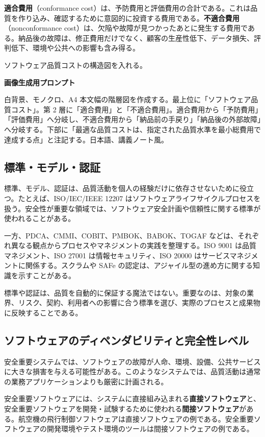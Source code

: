 \documentclass[11pt,a4paper]{article}
\newcommand{\term}[2]{\textbf{#1}（#2）}
\begin{document}
\term{適合費用}{conformance cost}は、予防費用と評価費用の合計である。これは品質を作り込み、確認するために意図的に投資する費用である。\term{不適合費用}{nonconformance cost}は、欠陥や故障が見つかったあとに発生する費用である。納品後の故障は、修正費用だけでなく、顧客の生産性低下、データ損失、評判低下、環境や公共への影響も含み得る。

\begin{todobox}
ソフトウェア品質コストの構造図を入れる。\par
\textbf{画像生成用プロンプト}\par
白背景、モノクロ、A4 本文幅の階層図を作成する。最上位に「ソフトウェア品質コスト」。第 2 層に「適合費用」と「不適合費用」。適合費用から「予防費用」「評価費用」へ分岐し、不適合費用から「納品前の手戻り」「納品後の外部故障」へ分岐する。下部に「最適な品質コストは、指定された品質水準を最小総費用で達成する点」と注記する。日本語、講義ノート風。
\end{todobox}

\subsection{標準・モデル・認証}
標準、モデル、認証は、品質活動を個人の経験だけに依存させないために役立つ。たとえば、ISO/IEC/IEEE 12207 はソフトウェアライフサイクルプロセスを扱う。安全性が重要な領域では、ソフトウェア安全計画や信頼性に関する標準が使われることがある。

一方、PDCA、CMMI、COBIT、PMBOK、BABOK、TOGAF などは、それぞれ異なる観点からプロセスやマネジメントの実践を整理する。ISO 9001 は品質マネジメント、ISO 27001 は情報セキュリティ、ISO 20000 はサービスマネジメントに関係する。スクラムや SAFe の認定は、アジャイル型の進め方に関する知識を示すことがある。

\begin{notebox}
標準や認証は、品質を自動的に保証する魔法ではない。重要なのは、対象の業界、リスク、契約、利用者への影響に合う標準を選び、実際のプロセスと成果物に反映することである。
\end{notebox}

\subsection{ソフトウェアのディペンダビリティと完全性レベル}
安全重要システムでは、ソフトウェアの故障が人命、環境、設備、公共サービスに大きな損害を与える可能性がある。このようなシステムでは、品質活動は通常の業務アプリケーションよりも厳密に計画される。

安全重要ソフトウェアには、システムに直接組み込まれる\textbf{直接ソフトウェア}と、安全重要ソフトウェアを開発・試験するために使われる\textbf{間接ソフトウェア}がある。航空機の飛行制御ソフトウェアは直接ソフトウェアの例である。安全重要ソフトウェアの開発環境やテスト環境のツールは間接ソフトウェアの例である。
\end{document}
